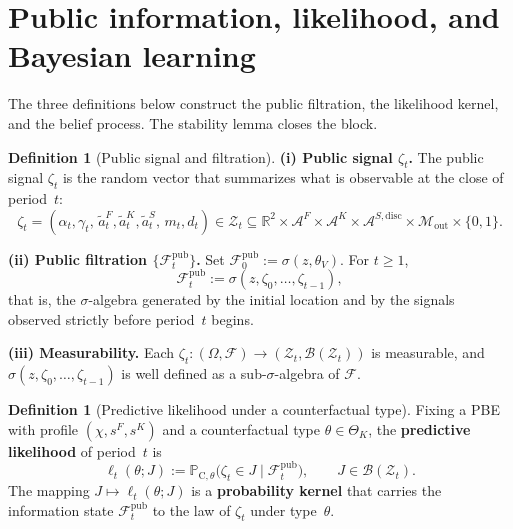 \documentclass[ecta,nameyear,final,supplement]{econsocart}
\numberwithin{equation}{section}
\numberwithin{table}{section}
\theoremstyle{definition}
\newtheorem{definition}[theorem]{Definition}
\newcommand{\ProbC}[1]{\mathbb{P}_{\mathrm{C},#1}}
\begin{document}
\section{Public information, likelihood, and Bayesian learning}
\label{sec:info-bayes}

\noindent The three definitions below construct the public filtration, the
likelihood kernel, and the belief process. The stability lemma closes the
block.


\begin{definition}[Public signal and filtration]
\label{def:zeta-filtration}
\noindent\textbf{(i) Public signal $\zeta_t$.}
The public signal $\zeta_t$ is the random vector that summarizes what is
observable at the close of period~$t$:
\[
\zeta_t=(\alpha_t,\gamma_t,\,\tilde{a}_t^F,\tilde{a}_t^K,\tilde{a}_t^S,\,m_t,d_t)
\in
\mathcal{Z}_t\subseteq\mathbb{R}^2\times\mathcal{A}^F\times\mathcal{A}^K
\times\mathcal{A}^{S,\mathrm{disc}}\times\mathcal{M}_{\mathrm{out}}\times\{0,1\}.
\]

\noindent\textbf{(ii) Public filtration $\{\mathcal{F}_t^{\mathrm{pub}}\}$.}
Set $\mathcal{F}_0^{\mathrm{pub}}:=\sigma(z,\theta_V)$. For $t\ge 1$,
\[
\mathcal{F}_t^{\mathrm{pub}}:=\sigma(z,\zeta_0,\ldots,\zeta_{t-1}),
\]
that is, the $\sigma$-algebra generated by the initial location and by the
signals observed strictly before period~$t$ begins.

\noindent\textbf{(iii) Measurability.}
Each $\zeta_t:(\Omega,\mathcal{F})\to(\mathcal{Z}_t,\mathcal{B}(\mathcal{Z}_t))$
is measurable, and $\sigma(z,\zeta_0,\ldots,\zeta_{t-1})$ is well defined as a
sub-$\sigma$-algebra of $\mathcal{F}$.
\end{definition}

\bigskip

\begin{definition}[Predictive likelihood under a counterfactual type]
\label{def:predictive-likelihood}
Fixing a PBE with profile $(\chi,s^F,s^K)$ and a counterfactual type
$\theta\in\Theta_K$, the \textbf{predictive likelihood} of period~$t$ is
\begin{equation}
\label{eq:likelihood-zeta}
\ell_t(\theta;J)
:=\ProbC{\theta}\bigl(\zeta_t\in J\mid\mathcal{F}_t^{\mathrm{pub}}\bigr),
\qquad J\in\mathcal{B}(\mathcal{Z}_t).
\end{equation}
The mapping $J\mapsto\ell_t(\theta;J)$ is a \textbf{probability kernel} that
carries the information state $\mathcal{F}_t^{\mathrm{pub}}$ to the law of
$\zeta_t$ under type~$\theta$.
\end{definition}
\end{document}
